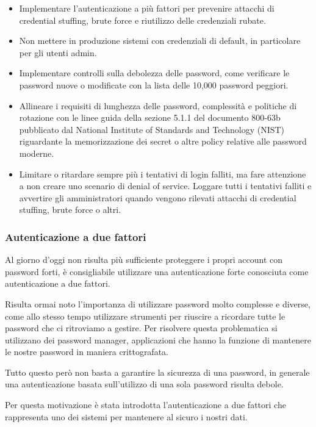 \begin{itemize}
    \item Implementare l'autenticazione a più fattori per prevenire attacchi di credential stuffing, brute force e riutilizzo delle credenziali rubate.
    \item Non mettere in produzione sistemi con credenziali di default, in particolare per gli utenti admin.
    \item Implementare controlli sulla debolezza delle password, come verificare le password nuove o modificate con la lista delle 10,000 password peggiori.
    \item Allineare i requisiti di lunghezza delle password, complessità e politiche di rotazione con le linee guida della sezione 5.1.1 del documento 800-63b pubblicato dal National Institute of Standards and Technology (NIST) riguardante la memorizzazione dei secret o altre policy relative alle password moderne.
    \item Limitare o ritardare sempre più i tentativi di login falliti, ma fare attenzione a non creare uno scenario di denial of service. Loggare tutti i tentativi falliti e avvertire gli amministratori quando vengono rilevati attacchi di credential stuffing, brute force o altri.
\end{itemize}

\subsubsection{Autenticazione a due fattori}
\cite{Autenticazione2fattori}
Al giorno d’oggi non risulta più sufficiente proteggere i propri account con password forti, è consigliabile utilizzare una autenticazione forte conosciuta come autenticazione a due fattori. 

Risulta ormai noto l’importanza di utilizzare password molto complesse e diverse, come allo stesso tempo utilizzare strumenti per riuscire a ricordare tutte le password che ci ritroviamo a gestire. Per risolvere questa problematica si utilizzano dei password manager, applicazioni che hanno la funzione di mantenere le nostre password in maniera crittografata. 

Tutto questo però non basta a garantire la sicurezza di una password, in generale una autenticazione basata sull’utilizzo di una sola password risulta debole. 

Per questa motivazione è stata introdotta l’autenticazione a due fattori che rappresenta uno dei sistemi per mantenere al sicuro i nostri dati. 

